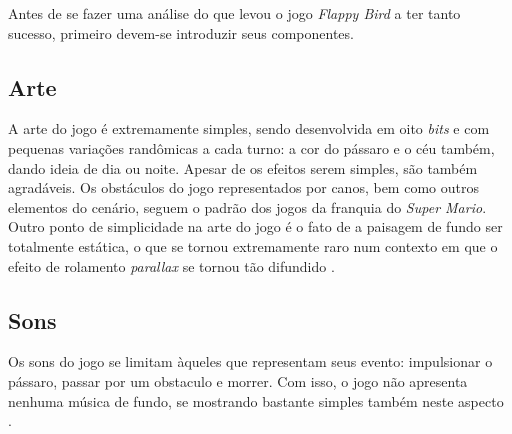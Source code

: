Antes de se fazer uma análise do que levou o jogo \textit{Flappy Bird} a ter tanto sucesso, primeiro devem-se introduzir seus componentes.

\subsection{Arte}
A arte do jogo é extremamente simples, sendo desenvolvida em oito \textit{bits} e com pequenas variações randômicas a cada turno: a cor do pássaro e o céu também, dando ideia de dia ou noite. Apesar de os efeitos serem simples, são também agradáveis. Os obstáculos do jogo representados por canos, bem como outros elementos do cenário, seguem o padrão dos jogos da franquia do \textit{Super Mario}. Outro ponto de simplicidade na arte do jogo é o fato de a paisagem de fundo ser totalmente estática, o que se tornou extremamente raro num contexto em que o efeito de rolamento \textit{parallax} se tornou tão difundido \cite{Eldic2014}.

\subsection{Sons}
Os sons do jogo se limitam àqueles que representam seus evento: impulsionar o pássaro, passar por um obstaculo e morrer. Com isso, o jogo não apresenta nenhuma música de fundo, se mostrando bastante simples também neste aspecto \cite{Eldic2014}.

